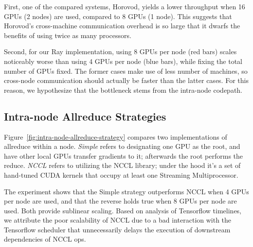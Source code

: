 First, one of the compared systems, Horovod, yields a lower throughput when 16
GPUs (2 nodes) are used, compared to 8 GPUs (1 node).  This suggests that
Horovod's cross-machine communication overhead is so large that it dwarfs the
benefits of using twice as many processors.

Second, for our Ray implementation, using 8 GPUs per node (red bars) scales
noticeably worse than using 4 GPUs per node (blue bars), while fixing the total
number of GPUs fixed.  The former cases make use of less number of machines, so
cross-node communication should actually be faster than the latter cases.  For
this reason, we hypothesize that the bottleneck stems from the intra-node
codepath.

\subsection{Intra-node Allreduce Strategies}
Figure~\ref{fig:intra-node-allreduce-strategy} compares two implementations of
allreduce within a node.  \emph{Simple} refers to designating one GPU as the
root, and have other local GPUs transfer gradients to it; afterwards the root
performs the reduce.  \emph{NCCL} refers to utilizing the NCCL library; under
the hood it's a set of hand-tuned CUDA kernels that occupy at least one
Streaming Multiprocessor.

The experiment shows that the Simple strategy outperforms NCCL when 4 GPUs per
node are used, and that the reverse holds true when 8 GPUs per node are
used. Both provide sublinear scaling. Based on analysis of Tensorflow timelines, 
we attribute the poor scalability of NCCL due to a bad interaction with the
Tensorflow scheduler that unnecessarily delays
the execution of downstream dependencies of NCCL ops.


